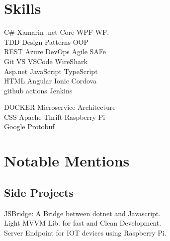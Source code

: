 \documentclass[]{deedy-resume-openfont}
\begin{document}
\begin{minipage}[t]{0.33\textwidth}
\section{Skills}
\vspace{1mm}
\textbullet{} C\# \textbullet{} Xamarin \textbullet{} .net Core
\textbullet{} WPF \textbullet{} WF.\\
\vspace{1mm}
\textbullet{} TDD \textbullet{} Design Patterns \textbullet{} OOP\\ 
\vspace{1mm}
\textbullet{} REST \textbullet{} Azure DevOps 
\textbullet{} Agile \textbullet{} SAFe\\
\vspace{1mm}
\textbullet{} Git \textbullet{} VS \textbullet{} VSCode \textbullet{} WireShark \\
\vspace{1mm}
\textbullet{} Asp.net \textbullet{} JavaScript \textbullet{} TypeScript\\
\vspace{1mm}
\textbullet{} HTML \textbullet{} Angular \textbullet{} Ionic \textbullet{} Cordova\\
\vspace{1mm}
\textbullet{} github actions \textbullet{} Jenkins

\vspace{\topsep}

\vspace{1mm}
\textbullet{} DOCKER \textbullet{} Microservice Architecture\\
\vspace{1mm}
\textbullet{} CSS \textbullet{} Apache Thrift \textbullet{} Raspberry Pi\\
\vspace{1mm}
\textbullet{} Google Protobuf

\vspace{\topsep}


\section{Notable Mentions}
\vspace{1mm}
\subsection{Side Projects}
\vspace{1mm}
\textbullet{} JSBridge: A Bridge between dotnet and Javascript.\\
\vspace{1mm}
\textbullet{} Light MVVM Lib. for fast and Clean Development.\\
\vspace{1mm}
\textbullet{} Server Endpoint for IOT devices using Raspberry Pi.\\
\sectionsep


\end{minipage}
\end{document}
